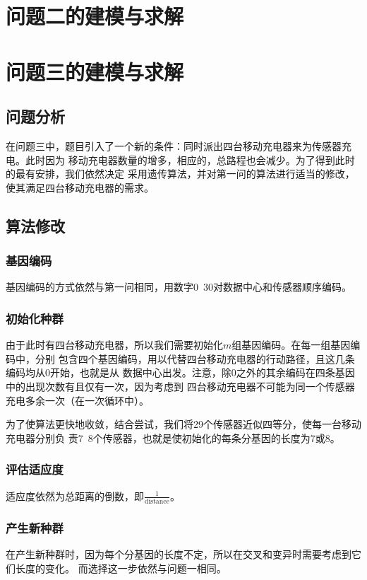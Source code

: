 \documentclass{ctexart}
\begin{document}
    \section{问题二的建模与求解}
    \section{问题三的建模与求解}
    \subsection{问题分析}
    在问题三中，题目引入了一个新的条件：同时派出四台移动充电器来为传感器充电。此时因为
    移动充电器数量的增多，相应的，总路程也会减少。为了得到此时的最有安排，我们依然决定
    采用遗传算法，并对第一问的算法进行适当的修改，使其满足四台移动充电器的需求。
    \subsection{算法修改}
    \subsubsection{基因编码}
    基因编码的方式依然与第一问相同，用数字0~30对数据中心和传感器顺序编码。
    \subsubsection{初始化种群}
    由于此时有四台移动充电器，所以我们需要初始化$m$组基因编码。在每一组基因编码中，分别
    包含四个基因编码，用以代替四台移动充电器的行动路径，且这几条编码均从0开始，也就是从
    数据中心出发。注意，除0之外的其余编码在四条基因中的出现次数有且仅有一次，因为考虑到
    四台移动充电器不可能为同一个传感器充电多余一次（在一次循环中）。

    为了使算法更快地收敛，结合尝试，我们将29个传感器近似四等分，使每一台移动充电器分别负
    责7~8个传感器，也就是使初始化的每条分基因的长度为7或8。
    \subsubsection{评估适应度}
    适应度依然为总距离的倒数，即$\frac{1}{\mbox{distance}}$。
    \subsubsection{产生新种群}
    在产生新种群时，因为每个分基因的长度不定，所以在交叉和变异时需要考虑到它们长度的变化。
    而选择这一步依然与问题一相同。
\end{document}
